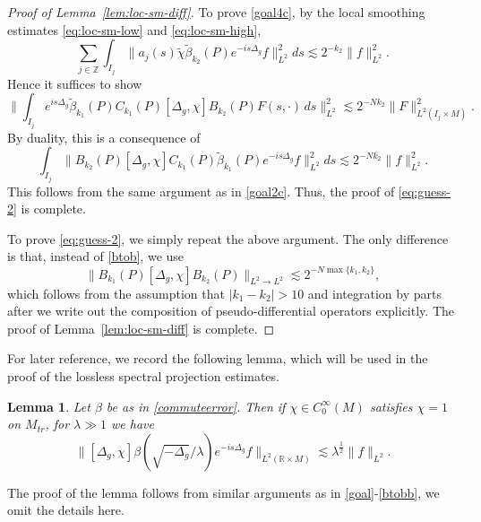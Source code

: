 \documentclass[10pt]{amsart}
\newtheorem{lemma}[theorem]{Lemma}
\newcommand{\la}{\lambda}
\newcommand{\1}{{\bf 1}}
\begin{document}
\begin{proof}[Proof of Lemma~\ref{lem:loc-sm-diff}]
To prove \eqref{goal4c}, by the local smoothing estimates \eqref{eq:loc-sm-low} and \eqref{eq:loc-sm-high},
\begin{equation*}
   \sum_{j\in \mathbb{Z}}\int_{I_j}\|a_j(s) \tilde\chi\tilde\beta_{k_2}(P)  e^{-is\Delta_g}f \|^2_{L^2}ds\lesssim 2^{-{k_2}}\|f\|^2_{L^2}.
\end{equation*}
Hence it suffices to show 
\begin{equation}\label{goal4ca}
  \| \int_{I_j} e^{is\Delta_{{g}}}\tilde\beta_{k_1}(P)C_{k_1}(P)[\Delta_g, \chi] B_{k_2}(P)F(s,\cdot)\,ds\|^2_{L^2}\lesssim 2^{-Nk_2}\|F\|^2_{L^2{(I_j\times M)}}.
\end{equation}
By duality,  this is a consequence of 
\begin{equation}\label{goal4d}
  \int_{I_j} \|B_{k_2}(P) [\Delta_g, \chi] C_{k_1}(P)\tilde\beta_{k_1}(P)  e^{-is\Delta_{ g}}f\|^2_{L^2}ds\lesssim 2^{-Nk_2}\|f\|_{L^2}^2.
\end{equation}
This follows from the same argument as in \eqref{goal2c}. Thus, the proof of \eqref{eq:guess-2} is complete.

To prove \eqref{eq:guess-2}, we simply repeat the above argument. The only difference is that, instead of \eqref{btob}, we use 
\begin{equation}\label{btobb}
    \|B_{k_1}(P)[\Delta_g, \chi] B_{k_2}(P)\|_{L^2\to L^2}\lesssim 2^{-N\max\{k_1,k_2\}},
\end{equation}
which follows from the assumption that $|k_1-k_2|> 10$ and integration by parts after we write out the composition of pseudo-differential operators explicitly. 
 The proof of Lemma~\ref{lem:loc-sm-diff} is complete.
\end{proof}

For later reference, we record the following lemma, which will be used in the proof of the lossless spectral projection estimates.
\begin{lemma}\label{lemsp}
Let  $\beta$ be as in \eqref{commuteerror}. 
Then if $\chi \in C_0^{\infty}(M)$ satisfies $\chi=1$ on $M_{tr}$, for $\lambda\gg 1$ we have 
\begin{equation}\label{a}
     \|[\Delta_g,\chi] \beta(\sqrt{-\Delta_{g}}/\lambda) e^{-is\Delta_g}f \|_{L^2(\mathbb{R}\times M)} \lesssim \la^{\frac12}\|f\|_{L^2}.
\end{equation}
\end{lemma}
The proof of the lemma follows from similar arguments as in \eqref{goal}-\eqref{btobb}, we omit the details here.


\bigskip 
\end{document}
